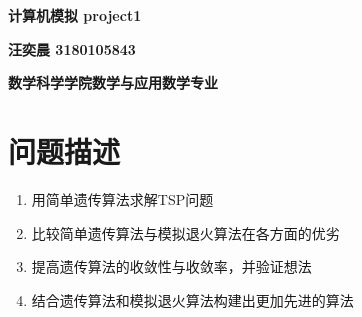 \documentclass[12pt]{article}
\begin{document}
\pagestyle{fancy}
\setcounter{page}{1}
\vspace{20pt}
\centerline{{\Large \textbf{计算机模拟 project1}}}
\vspace{15pt}

\centerline{{\large \textbf{汪奕晨 3180105843}}}
\vspace{10pt}

\centerline{{\large \textbf{数学科学学院\hspace{5pt}数学与应用数学专业}}}
\vspace{15pt}

\section{问题描述}
\begin{enumerate}
    \item 用简单遗传算法求解TSP问题
    \item 比较简单遗传算法与模拟退火算法在各方面的优劣
    \item 提高遗传算法的收敛性与收敛率，并验证想法
    \item 结合遗传算法和模拟退火算法构建出更加先进的算法
\end{enumerate}


\end{document}
